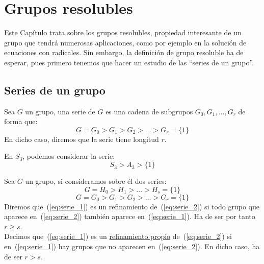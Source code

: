 \chapter{Grupos resolubles} %
Este Capítulo trata sobre los grupos resolubles, propiedad interesante de un grupo que tendrá numerosas aplicaciones, como por ejemplo en la solución de ecuaciones con radicales. Sin embargo, la definición de grupo resoluble ha de esperar, pues primero tenemos que hacer un estudio de las ``series de un grupo''.

\section{Series de un grupo}
\begin{definicion}
    Sea $G$ un grupo, una serie de $G$ es una cadena de subgrupos $G_0,G_1,\ldots, G_r$ de forma que:
    \begin{equation*}
        G = G_0 > G_1 > G_2 > \ldots > G_r = \{1\}
    \end{equation*}
    En dicho caso, diremos que la serie tiene longitud $r$.
\end{definicion}

\begin{ejemplo}
    En $S_3$, podemos considerar la serie:
    \begin{equation*}
        S_3 > A_3 > \{1\}
    \end{equation*}
\end{ejemplo}

\begin{definicion}[Refinamiento]
    Sea $G$ un grupo, si consideramos sobre él dos series:
    \begin{equation}\label{eq:serie_2}
        G = H_0 > H_1 > \ldots > H_s = \{1\}
    \end{equation}
    \begin{equation}\label{eq:serie_1}
        G = G_0 > G_1 > G_2 > \ldots > G_r = \{1\}
    \end{equation}
    Diremos que~(\ref{eq:serie_1}) es un refinamiento de~(\ref{eq:serie_2}) si todo grupo que aparece en~(\ref{eq:serie_2}) también aparece en~(\ref{eq:serie_1}). Ha de ser por tanto $r\geq s$.\\

    \noindent
    Decimos que~(\ref{eq:serie_1}) es un \underline{refinamiento propio} de~(\ref{eq:serie_2}) si en~(\ref{eq:serie_1}) hay grupos que no aparecen en~(\ref{eq:serie_2}). En dicho caso, ha de ser $r>s$.
\end{definicion}

